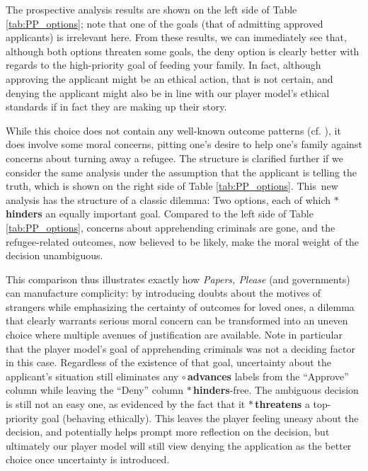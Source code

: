 \documentclass[arts,article,accept,moreauthors,pdftex,10pt,a4paper]{Definitions/mdpi}
\newcommand{\badsym}{$\ast$}
\newcommand{\goodsym}{$\circ$}
\newcommand{\ncemph}[1]{\textbf{\sffamily #1}}
\newcommand{\advances}{\ncemph{\color{advances}\goodsym{}\,advances}}
\newcommand{\threatens}{\ncemph{\color{threatens}\badsym{}\,threatens}}
\newcommand{\hinders}{\ncemph{\color{hinders}\badsym{}\,hinders}}
\begin{document}
The prospective analysis results are shown on the left side of Table \ref{tab:PP_options}; note that one of the goals (that of admitting approved applicants) is irrelevant here.
%
From these results, we can immediately see that, although both options threaten some goals, the deny option is clearly better with regards to the high-priority goal of feeding your family.
%
In fact, although approving the applicant might be an ethical action, that is not certain, and denying the applicant might also be in line with our player model's ethical standards if in fact they are making up their story.


While this choice does not contain any well-known outcome patterns (cf. \cite{mawhorter2014towards}), it does involve some moral concerns, pitting one's desire to help one's family against concerns about turning away a refugee.
%
The structure is clarified further if we consider the same analysis under the assumption that the applicant is telling the truth, which is shown on the right side of Table \ref{tab:PP_options}.
%
This~new analysis has the structure of a classic dilemma: Two options, each of which \hinders{} an equally important goal.
%
Compared to the left side of Table \ref{tab:PP_options}, concerns about apprehending criminals are gone, and the refugee-related outcomes, now believed to be likely, make the moral weight of the decision unambiguous.


This comparison thus illustrates exactly how \emph{Papers, Please} (and governments) can manufacture complicity: by introducing doubts about the motives of strangers while emphasizing the certainty of outcomes for loved ones, a dilemma that clearly warrants serious moral concern can be transformed into an uneven choice where multiple avenues of justification are available.
%
Note in particular that the player model's goal of apprehending criminals was not a deciding factor in this case.
%
Regardless of the existence of that goal, uncertainty about the applicant's situation still eliminates any \advances{} labels from the ``Approve'' column while leaving the ``Deny'' column \hinders{}-free.
%
The ambiguous decision is still not an easy one, as evidenced by the fact that it \threatens{} a top-priority goal (behaving ethically).
%
This leaves the player feeling uneasy about the decision, and potentially helps prompt more reflection on the decision, but ultimately our player model will still view denying the application as the better choice once uncertainty is introduced.
\end{document}
